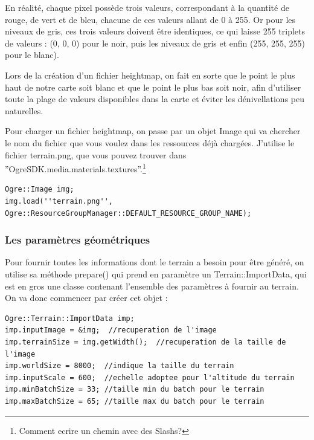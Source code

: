\documentclass[10pt,a4paper]{report}
\begin{document}
En r\'ealit\'e, chaque pixel poss\`ede trois valeurs, correspondant \`a la quantit\'e de rouge, de vert et de bleu, chacune de ces valeurs allant de 0 \`a 255. Or pour les niveaux de gris, ces trois valeurs doivent \^etre identiques, ce qui laisse 255 triplets de valeurs : (0, 0, 0) pour le noir, puis les niveaux de gris et enfin (255, 255, 255) pour le blanc).

Lors de la cr\'eation d'un fichier heightmap, on fait en sorte que le point le plus haut de notre carte soit blanc et que le point le plus bas soit noir, afin d'utiliser toute la plage de valeurs disponibles dans la carte et \'eviter les d\'enivellations peu naturelles.

Pour charger un fichier heightmap, on passe par un objet Image qui va chercher le nom du fichier que vous voulez dans les ressources d\'ej\`a charg\'ees. J'utilise le fichier terrain.png, que vous pouvez trouver dans ''OgreSDK.media.materials.textures''.\footnote{Comment ecrire un chemin avec des Slashs?}

\begin{lstlisting}[caption={Chargement du fichier heightmap}]
Ogre::Image img;
img.load(''terrain.png'', Ogre::ResourceGroupManager::DEFAULT_RESOURCE_GROUP_NAME);
\end{lstlisting}






\subsubsection{Les param\`etres g\'eom\'etriques}


Pour fournir toutes les informations dont le terrain a besoin pour \^etre g\'en\'er\'e, on utilise sa m\'ethode prepare() qui prend en param\`etre un Terrain::ImportData, qui est en gros une classe contenant l'ensemble des param\`etres \`a fournir au terrain. On va donc commencer par cr\'eer cet objet :

\begin{lstlisting}[caption={Cr\'eation de l'objet ImportData pour la d\'efinition des param\`etres \`a fournir au terrain}]
Ogre::Terrain::ImportData imp;
imp.inputImage = &img;  //recuperation de l'image
imp.terrainSize = img.getWidth();  //recuperation de la taille de l'image
imp.worldSize = 8000;  //indique la taille du terrain
imp.inputScale = 600;  //echelle adoptee pour l'altitude du terrain
imp.minBatchSize = 33; //taille min du batch pour le terrain
imp.maxBatchSize = 65; //taille max du batch pour le terrain
\end{lstlisting}
\end{document}
